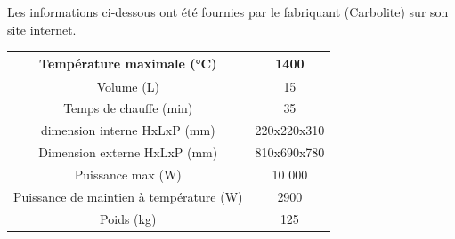\documentclass{article}
\begin{document}
Les informations ci-dessous ont été fournies par le fabriquant (Carbolite) sur son site internet.

\begin{tabular}{|c|c|}
\hline
Température maximale (°C) & 1400  \\
\hline
Volume (L) & 15 \\
\hline
Temps de chauffe (min) & 35 \\
\hline
dimension interne HxLxP (mm) & 220x220x310 \\
\hline
Dimension externe HxLxP (mm) & 810x690x780 \\
\hline
Puissance max (W) & 10 000 \\
\hline
Puissance de maintien à température (W) & 2900 \\
\hline
Poids (kg) & 125 \\
\hline
\end{tabular} 
\end{document}

